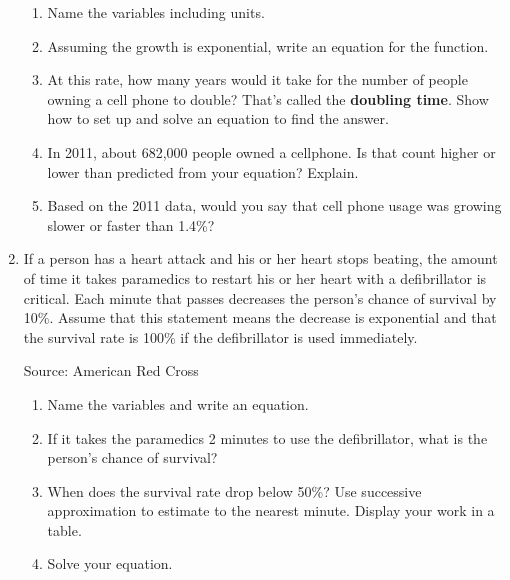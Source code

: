 \begin{enumerate}
\begin{enumerate}
\item Name the variables including units.  \vfill
\item Assuming the growth is exponential, write an equation for the function.  \vfill
\item At this rate, how many years would it take for the number of people owning a cell phone to double?  That's called the  \textbf{doubling time}.  Show how to set up and solve an equation to find the answer.  \vfill   \vfill
\item In 2011, about 682,000 people owned a cellphone.  Is that count higher or lower than predicted from your equation?  Explain.  \vfill
\item Based on the 2011 data, would you say that cell phone usage was growing slower or faster than 1.4\%?  \vfill
\end{enumerate}

\newpage %

\item  If a person has a heart attack and his or her heart stops beating, the amount of time it takes paramedics to restart his or her heart with a defibrillator is critical.  Each minute that passes decreases the person's chance of survival by 10\%.  Assume that this statement means the decrease is exponential and that the survival rate is 100\% if the defibrillator is used immediately. \hfill \begin{footnotesize} Source: American Red Cross \end{footnotesize}
\begin{enumerate}
\item Name the variables and write an equation. \vfill
\item If it takes the paramedics 2 minutes to use the defibrillator, what is the person's chance of survival? \vfill
\item When does the survival rate drop below 50\%? Use successive approximation to estimate to the nearest minute.  Display your work in a table. \vfill \vfill
\item Solve your equation. \vfill \vfill
\end{enumerate}  

\newpage %


\end{enumerate}
